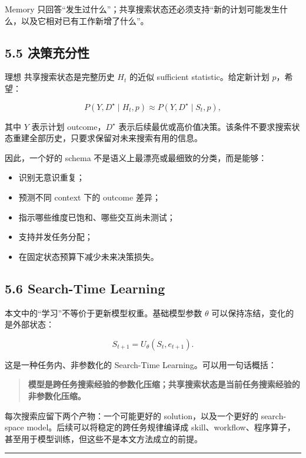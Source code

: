 \documentclass[
  11pt]{ctexart}
\providecommand{\tightlist}{%
  \setlength{\itemsep}{0pt}\setlength{\parskip}{0pt}}
\begin{document}
Memory
只回答``发生过什么''；共享搜索状态还必须支持``新的计划可能发生什么，以及它相对已有工作新增了什么''。

\subsection{5.5 决策充分性}\label{ux51b3ux7b56ux5145ux5206ux6027}

理想 共享搜索状态是完整历史 \(H_t\) 的近似 sufficient
statistic。给定新计划 \(p\)，希望：

\[
P(Y, D^\star \mid H_t,p)
\approx
P(Y,D^\star \mid S_t,p),
\]

其中 \(Y\) 表示计划 outcome，\(D^\star\)
表示后续最优或高价值决策。该条件不要求搜索状态重建全部历史，只要求保留对未来搜索有用的信息。

因此，一个好的 schema 不是语义上最漂亮或最细致的分类，而是能够：

\begin{itemize}
\tightlist
\item
  识别无意识重复；
\item
  预测不同 context 下的 outcome 差异；
\item
  指示哪些维度已饱和、哪些交互尚未测试；
\item
  支持并发任务分配；
\item
  在固定状态预算下减少未来决策损失。
\end{itemize}

\subsection{5.6 Search-Time Learning}\label{search-time-learning}

本文中的``学习''不等价于更新模型权重。基础模型参数 \(\theta\)
可以保持冻结，变化的是外部状态：

\[
S_{t+1}=U_\theta(S_t,e_{t+1}).
\]

这是一种任务内、非参数化的 Search-Time Learning。可以用一句话概括：

\begin{quote}
\textbf{模型是跨任务搜索经验的参数化压缩；共享搜索状态是当前任务搜索经验的非参数化压缩。}
\end{quote}

每次搜索应留下两个产物：一个可能更好的 solution，以及一个更好的
search-space model。后续可以将稳定的跨任务规律编译成
skill、workflow、程序算子，甚至用于模型训练，但这些不是本文方法成立的前提。

\begin{center}\rule{0.5\linewidth}{0.5pt}\end{center}
\end{document}
